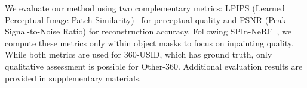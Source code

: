 


\vspace{3pt}
We evaluate our method using two complementary metrics: LPIPS (Learned Perceptual Image Patch Similarity)~\citep{zhang2018unreasonable} for perceptual quality and PSNR (Peak Signal-to-Noise Ratio) for reconstruction accuracy. Following SPIn-NeRF~\citep{spinnerf}, we compute these metrics only within object masks to focus on inpainting quality. While both metrics are used for 360-USID, which has ground truth, only qualitative assessment is possible for Other-360. Additional evaluation results are provided in supplementary materials.

